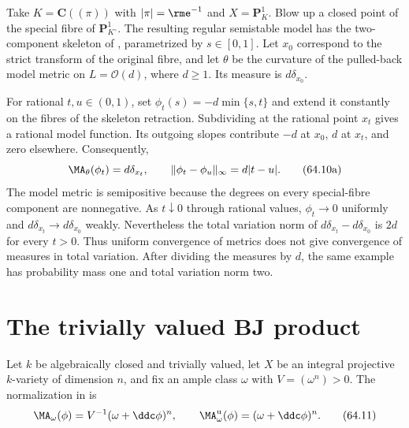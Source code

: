 \begin{example}\label{ex:cma-weak-not-variation}
Take $K=\mathbf C((\pi))$ with $|\pi|=\rme^{-1}$ and $X=\mathbf P^1_K$. Blow up a closed point of the special fibre of $\mathbf P^1_{K^\circ}$. The resulting regular semistable model has the two-component skeleton of , parametrized by $s\in[0,1]$. Let $x_0$ correspond to the strict transform of the original fibre, and let $\theta$ be the curvature of the pulled-back model metric on $L=\mathcal O(d)$, where $d\geq1$. Its measure is $d\delta_{x_0}$.

For rational $t,u\in(0,1)$, set $\phi_t(s)=-d\min\{s,t\}$ and extend it constantly on the fibres of the skeleton retraction. Subdividing at the rational point $x_t$ gives a rational model function. Its outgoing slopes contribute $-d$ at $x_0$, $d$ at $x_t$, and zero elsewhere. Consequently,
\[
 \MA_\theta(\phi_t)=d\delta_{x_t},\qquad
 \|\phi_t-\phi_u\|_\infty=d|t-u|.
\tag{64.10a}\label{eq:cma-moving-atom}
\]
The model metric is semipositive because the degrees on every special-fibre component are nonnegative. As $t\downarrow0$ through rational values, $\phi_t\to0$ uniformly and $d\delta_{x_t}\to d\delta_{x_0}$ weakly. Nevertheless the total variation norm of $d\delta_{x_t}-d\delta_{x_0}$ is $2d$ for every $t>0$. Thus uniform convergence of metrics does not give convergence of measures in total variation. After dividing the measures by $d$, the same example has probability mass one and total variation norm two.
\end{example}

\section{The trivially valued BJ product}
\label{sec:cma-bj}

Let $k$ be algebraically closed and trivially valued,
let $X$ be an integral projective $k$-variety of dimension $n$, and
fix an ample class $\omega$ with $V=(\omega^n)>0$.
The normalization in  is
\[
 \MA_\omega(\phi)=V^{-1}(\omega+\ddc\phi)^n,
 \qquad
 \MA^{\mathrm u}_\omega(\phi)=(\omega+\ddc\phi)^n.
\tag{64.11}\label{eq:cma-bj-normalizations}
\]

